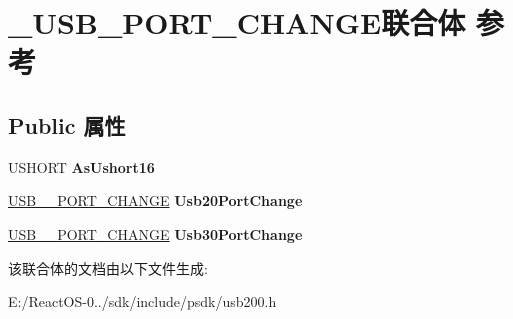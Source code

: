 \hypertarget{union___u_s_b___p_o_r_t___c_h_a_n_g_e}{}\section{\+\_\+\+U\+S\+B\+\_\+\+P\+O\+R\+T\+\_\+\+C\+H\+A\+N\+G\+E联合体 参考}
\label{union___u_s_b___p_o_r_t___c_h_a_n_g_e}
\subsection*{Public 属性}
\begin{DoxyCompactItemize}
\item 
\mbox{\label{union___u_s_b___p_o_r_t___c_h_a_n_g_e_a7f5a18add9d3c46a362cb854078355f2}} 
U\+S\+H\+O\+RT {\bfseries As\+Ushort16}
\item 
\mbox{\label{union___u_s_b___p_o_r_t___c_h_a_n_g_e_a04f9faf60bdc039a0fa7c3f7deba5f5a}} 
\hyperlink{union___u_s_b__20___p_o_r_t___c_h_a_n_g_e}{U\+S\+B\+\_\+\_\+\+P\+O\+R\+T\+\_\+\+C\+H\+A\+N\+GE} {\bfseries Usb20\+Port\+Change}
\item 
\mbox{\label{union___u_s_b___p_o_r_t___c_h_a_n_g_e_a71817b9c8d303b7b043cc22687e865d8}} 
\hyperlink{union___u_s_b__30___p_o_r_t___c_h_a_n_g_e}{U\+S\+B\+\_\+\_\+\+P\+O\+R\+T\+\_\+\+C\+H\+A\+N\+GE} {\bfseries Usb30\+Port\+Change}
\end{DoxyCompactItemize}


该联合体的文档由以下文件生成\+:\begin{DoxyCompactItemize}
\item 
E\+:/\+React\+O\+S-\/0../sdk/include/psdk/usb200.\+h\end{DoxyCompactItemize}
